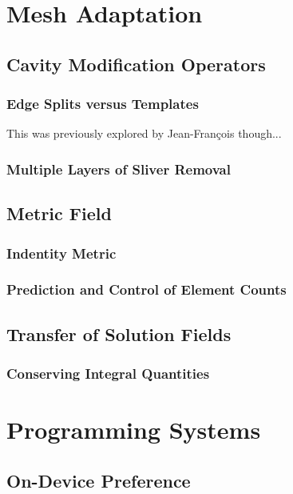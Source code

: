 \section{Mesh Adaptation}

\subsection{Cavity Modification Operators}

\subsubsection{Edge Splits versus Templates}

This was previously explored by Jean-Fran\c{c}ois though...

\subsubsection{Multiple Layers of Sliver Removal}

\subsection{Metric Field}

\subsubsection{Indentity Metric}

\subsubsection{Prediction and Control of Element Counts}

\subsection{Transfer of Solution Fields}

\subsubsection{Conserving Integral Quantities}

\section{Programming Systems}

\subsection{On-Device Preference}

